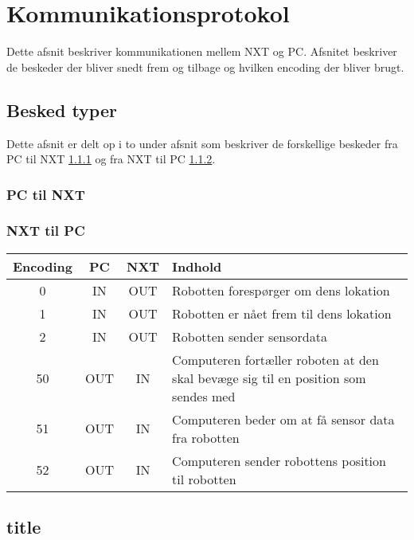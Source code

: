 \section{Kommunikationsprotokol}
Dette afsnit beskriver kommunikationen mellem NXT og PC.
Afsnitet beskriver de beskeder der bliver snedt frem og tilbage og hvilken encoding der bliver brugt.

\subsection{Besked typer}
Dette afsnit er delt op i to under afsnit som beskriver de forskellige beskeder fra PC til NXT \cref{design:pctilnxt} og fra NXT til PC \cref{design:nxttilpc}.
\subsubsection{PC til NXT}\label{design:pctilnxt}

\subsubsection{NXT til PC}\label{design:nxttilpc}

\begin{table}[h]
\label{design:protokol_tabel}
\caption{Overigt over de forskellige encodings og hvilke beskeder de indeholder.}
\begin{longtable}{ c | c | c | p{}}
Encoding & PC & NXT & Indhold\\
\hline
\hline
0 & IN & OUT & Robotten forespørger om dens lokation \\
1 & IN & OUT & Robotten er nået frem til dens lokation \\
2 & IN & OUT & Robotten sender sensordata \\
50 & OUT & IN & Computeren fortæller roboten at den skal bevæge sig til en position som sendes med\\
51 & OUT & IN & Computeren beder om at få sensor data fra robotten \\
52 & OUT & IN & Computeren sender robottens position til robotten \\
\end{longtable}
\end{table}

\subsection{title}
